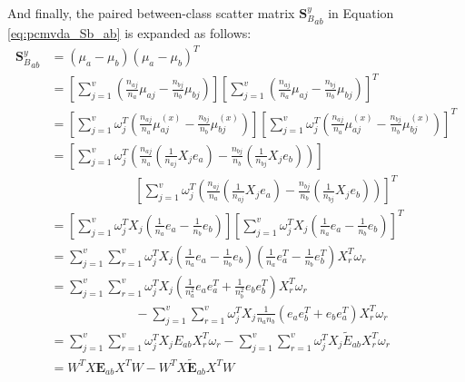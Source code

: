 \begin{appendix}
    And finally, the paired between-class scatter matrix ${\boldsymbol{S}_B^y}_{ab}$ in Equation \eqref{eq:pcmvda_Sb_ab} is expanded as follows:
    \begin{equation}
        \begin{split}
            {\boldsymbol{S}_B^y}_{ab} &= {\left(\mu_a-\mu_b\right)\left(\mu_a-\mu_b\right)^T} \\
            &= \left[\sum_{j=1}^{v}\left(\frac{n_{aj}}{n_a}\mu_{aj} - \frac{n_{bj}}{n_b}\mu_{bj}\right)\right] \left[\sum_{j=1}^{v}\left(\frac{n_{aj}}{n_a}\mu_{aj} - \frac{n_{bj}}{n_b}\mu_{bj}\right)\right]^T \\
            &= \left[\sum_{j=1}^{v}\omega_j^T\left(\frac{n_{aj}}{n_a}\mu^{(x)}_{aj} - \frac{n_{bj}}{n_b}\mu^{(x)}_{bj}\right)\right] \left[\sum_{j=1}^{v}\omega_j^T\left(\frac{n_{aj}}{n_a}\mu^{(x)}_{aj} - \frac{n_{bj}}{n_b}\mu^{(x)}_{bj}\right)\right]^T \\
            &= \left[\sum_{j=1}^{v}\omega_j^T\left(\frac{n_{aj}}{n_a}\left(\frac{1}{n_{aj}}X_j e_a\right) - \frac{n_{bj}}{n_b}\left(\frac{1}{n_{bj}}X_j e_b\right)\right)\right] \\
            &\ \ \ \ \ \ \ \ \ \ \ \ \ \ \ \ \ \ \ \ \ \ \ \ \ \ \ \ \ \ \left[\sum_{j=1}^{v}\omega_j^T\left(\frac{n_{aj}}{n_a}\left(\frac{1}{n_{aj}}X_j e_a\right) - \frac{n_{bj}}{n_b}\left(\frac{1}{n_{bj}}X_j e_b\right)\right)\right]^T \\
            &= \left[\sum_{j=1}^{v}\omega_j^T X_j\left(\frac{1}{n_a}e_a - \frac{1}{n_b}e_b\right)\right] \left[\sum_{j=1}^{v}\omega_j^T X_j\left(\frac{1}{n_a}e_a - \frac{1}{n_b}e_b\right)\right]^T \\
            &= \sum_{j=1}^{v}\sum_{r=1}^{v}\omega_j^T X_j \left(\frac{1}{n_a}e_a - \frac{1}{n_b}e_b\right) \left(\frac{1}{n_a}e_a^T - \frac{1}{n_b}e_b^T\right) X_r^T\omega_r \\
            &= \sum_{j=1}^{v}\sum_{r=1}^{v}\omega_j^T X_j \left(\frac{1}{n_a^2}e_a e_a^T + \frac{1}{n_b^2}e_b e_b^T\right) X_r^T\omega_r \\
            &\ \ \ \ \ \ \ \ \ \ \ \ \ \ \ \ \ \ \ \ \ \ \ \ \ \ \ \ \ \ - \sum_{j=1}^{v}\sum_{r=1}^{v}\omega_j^T X_j \frac{1}{n_a n_b}\left(e_a e_b^T + e_b e_a^T\right) X_r^T\omega_r \\
            &= \sum_{j=1}^{v}\sum_{r=1}^{v}\omega_j^T X_j E_{ab} X_r^T\omega_r - \sum_{j=1}^{v}\sum_{r=1}^{v}\omega_j^T X_j \tilde{E}_{ab} X_r^T\omega_r \\
            &= W^T X \boldsymbol{E}_{ab} X^T W - W^T X \boldsymbol{\tilde{E}}_{ab} X^T W \\

\end{split}
\end{equation}
\end{appendix}
